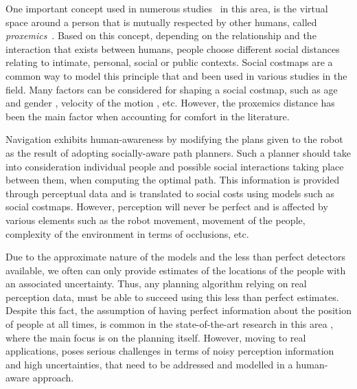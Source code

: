 One important concept used in numerous studies~\cite{Mumm2011,Takayama2009,Walters2011,ferrer2013robot} in this area, is the virtual space around a person that is mutually respected by other humans, called \textit{proxemics}~\cite{Hall1969}.
Based on this concept, depending on the relationship and the interaction that exists between humans, people choose different social distances relating to intimate, personal, social or public contexts.
Social costmaps are a common way to model this principle that and been used in various studies in the field. %
Many factors can be considered for shaping a social costmap, such as age and gender \cite{dautenhahn2006may}, velocity of the motion \cite{kirby2009companion}, etc. However, the proxemics distance has been the main factor when accounting for comfort in the literature.%

Navigation exhibits human-awareness by modifying the plans given to the robot as the result of adopting socially-aware path planners.
Such a planner should take into consideration individual people and possible social interactions taking place between them, when computing the optimal path. This information is provided through perceptual data and is translated to social costs using models such as social costmaps. However, perception will never be perfect and is affected by various elements such as the robot movement, movement of the people, complexity of the environment in terms of occlusions, etc. 


Due to the approximate nature of the models and the less than perfect detectors available, we often can only provide estimates of the locations of the people with an associated uncertainty. Thus, any planning algorithm relying on real perception data, must be able to succeed using this less than perfect estimates. Despite this fact, the assumption of having perfect information about the position of people at all times, is common in the state-of-the-art research in this area%
, where the main focus is on the planning itself. However, moving to real applications, poses serious challenges in terms of noisy perception information and high uncertainties, that need to be addressed and modelled in a human-aware approach.


